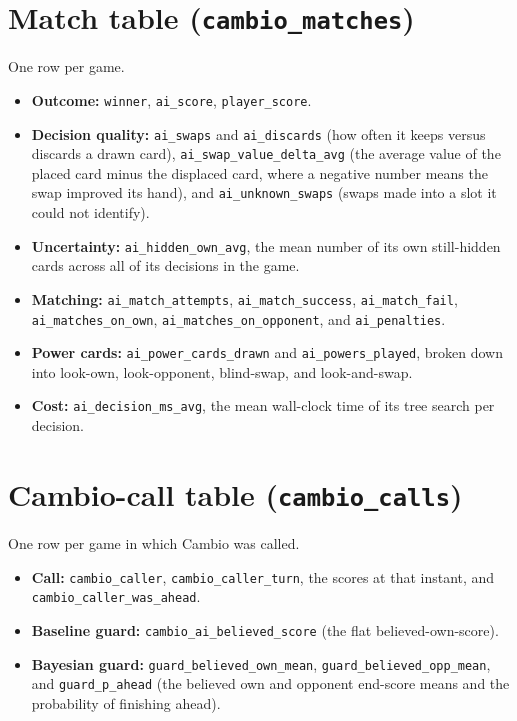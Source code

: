 \documentclass[12pt,a4paper,oneside]{report}
\begin{document}
\begin{appendices}
\section*{Match table (\texttt{cambio\_matches})}
One row per game.
\begin{itemize}
  \item \textbf{Outcome:} \texttt{winner}, \texttt{ai\_score}, \texttt{player\_score}.
  \item \textbf{Decision quality:} \texttt{ai\_swaps} and \texttt{ai\_discards} (how often it keeps versus discards a drawn card), \texttt{ai\_swap\_value\_delta\_avg} (the average value of the placed card minus the displaced card, where a negative number means the swap improved its hand), and \texttt{ai\_unknown\_swaps} (swaps made into a slot it could not identify).
  \item \textbf{Uncertainty:} \texttt{ai\_hidden\_own\_avg}, the mean number of its own still-hidden cards across all of its decisions in the game.
  \item \textbf{Matching:} \texttt{ai\_match\_attempts}, \texttt{ai\_match\_success}, \texttt{ai\_match\_fail}, \texttt{ai\_matches\_on\_own}, \texttt{ai\_matches\_on\_opponent}, and \texttt{ai\_penalties}.
  \item \textbf{Power cards:} \texttt{ai\_power\_cards\_drawn} and \texttt{ai\_powers\_played}, broken down into look-own, look-opponent, blind-swap, and look-and-swap.
  \item \textbf{Cost:} \texttt{ai\_decision\_ms\_avg}, the mean wall-clock time of its tree search per decision.
\end{itemize}

\section*{Cambio-call table (\texttt{cambio\_calls})}
One row per game in which Cambio was called.
\begin{itemize}
  \item \textbf{Call:} \texttt{cambio\_caller}, \texttt{cambio\_caller\_turn}, the scores at that instant, and \texttt{cambio\_caller\_was\_ahead}.
  \item \textbf{Baseline guard:} \texttt{cambio\_ai\_believed\_score} (the flat believed-own-score).
  \item \textbf{Bayesian guard:} \texttt{guard\_believed\_own\_mean}, \texttt{guard\_believed\_opp\_mean}, and \texttt{guard\_p\_ahead} (the believed own and opponent end-score means and the probability of finishing ahead).
\end{itemize}


\end{appendices}
\end{document}

